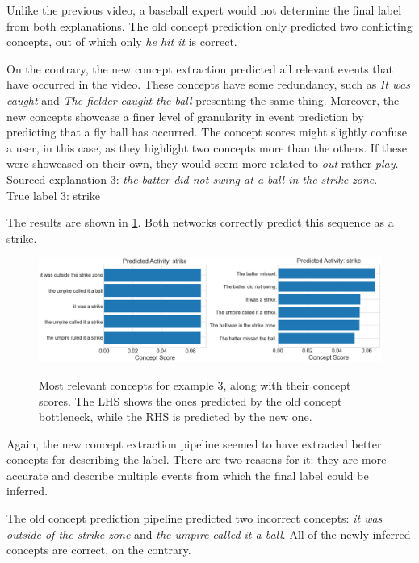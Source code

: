 Unlike the previous video, a baseball expert would not determine the final label from both explanations.
The old concept prediction only predicted two conflicting concepts, out of which only \emph{he hit it} is correct.

On the contrary, the new concept extraction predicted all relevant events that have occurred in the video.
These concepts have some redundancy, such as \emph{It was caught} and \emph{The fielder caught the ball} presenting the same thing.
Moreover, the new concepts showcase a finer level of granularity in event prediction by predicting that a fly ball has occurred. 
The concept scores might slightly confuse a user, in this case, as they highlight two concepts more than the others. 
If these were showcased on their own, they would seem more related to \textit{out} rather \emph{play}. \\

Sourced explanation 3: \emph{the batter did not swing at a ball in the strike zone}. \\
True label 3: strike

The results are shown in \ref{concept-results-3}.
Both networks correctly predict this sequence as a strike.

\begin{figure}[h]
\caption{Most relevant concepts for example 3, along with their concept scores. The LHS shows the ones predicted by the old concept bottleneck, while the RHS is predicted by the new one.}
\centering
\includegraphics[width=\textwidth]{concept-bottleneck-pipeline/explanations_concepts3.png}
\label{concept-results-3}
\end{figure}

Again, the new concept extraction pipeline seemed to have extracted better concepts for describing the label.
There are two reasons for it: they are more accurate and describe multiple events from which the final label could be inferred.

The old concept prediction pipeline predicted two incorrect concepts: \emph{it was outside of the strike zone} and \emph{the umpire called it a ball}.
All of the newly inferred concepts are correct, on the contrary.

